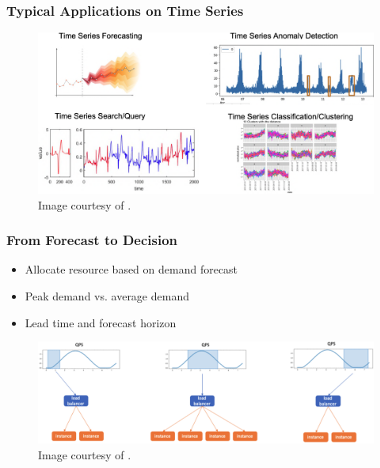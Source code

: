 \documentclass[aspectratio=169,xcolor=x11names,table]{beamer}
\begin{document}
\begin{frame}
	\frametitle{Typical Applications on Time Series}
	\begin{figure}
		\centering
		\includegraphics[width=\linewidth]{time_series_applications}
		\tiny{Image courtesy of \cite{wen2022robust}.}
	\end{figure}
\end{frame}

\begin{frame}
	\frametitle{From Forecast to Decision}
	\begin{itemize}
		\item Allocate resource based on demand forecast
		\item Peak demand vs. average demand
		\item Lead time and forecast horizon
	\end{itemize}
	\vfill
	\begin{figure}
		\centering
		\includegraphics[width=\linewidth]{forecast}
		\tiny{Image courtesy of \cite{wen2022robust}.}
	\end{figure}
\end{frame}
\end{document}

